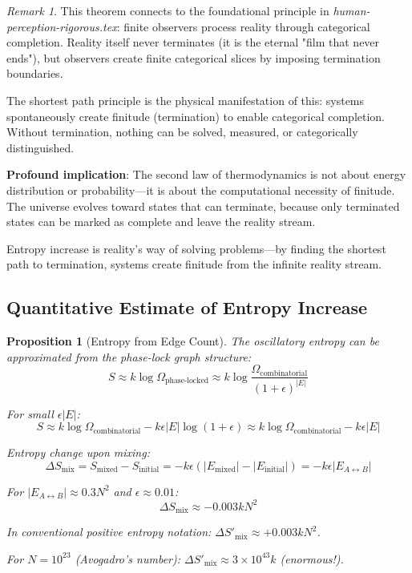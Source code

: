 \documentclass[12pt,a4paper]{article}
\newtheorem{proposition}[theorem]{Proposition}
\theoremstyle{remark}
\newtheorem{remark}[theorem]{Remark}
\begin{document}
\begin{remark}
This theorem connects to the foundational principle in \textit{human-perception-rigorous.tex}: finite observers process reality through categorical completion. Reality itself never terminates (it is the eternal "film that never ends"), but observers create finite categorical slices by imposing termination boundaries.

The shortest path principle is the physical manifestation of this: systems spontaneously create finitude (termination) to enable categorical completion. Without termination, nothing can be solved, measured, or categorically distinguished.

\textbf{Profound implication}: The second law of thermodynamics is not about energy distribution or probability—it is about the computational necessity of finitude. The universe evolves toward states that can terminate, because only terminated states can be marked as complete and leave the reality stream.

Entropy increase is reality's way of solving problems—by finding the shortest path to termination, systems create finitude from the infinite reality stream.
\end{remark}

\subsection{Quantitative Estimate of Entropy Increase}

\begin{proposition}[Entropy from Edge Count]
The oscillatory entropy can be approximated from the phase-lock graph structure:
\begin{equation}
S \approx k \log \Omega_{\text{phase-locked}} \approx k \log \frac{\Omega_{\text{combinatorial}}}{(1 + \epsilon)^{|E|}}
\end{equation}

For small $\epsilon |E|$:
\begin{equation}
S \approx k \log \Omega_{\text{combinatorial}} - k \epsilon |E| \log(1 + \epsilon) \approx k \log \Omega_{\text{combinatorial}} - k\epsilon |E|
\end{equation}

Entropy change upon mixing:
\begin{equation}
\Delta S_{\text{mix}} = S_{\text{mixed}} - S_{\text{initial}} = -k\epsilon(|E_{\text{mixed}}| - |E_{\text{initial}}|) = -k\epsilon |E_{A \leftrightarrow B}|
\end{equation}

For $|E_{A \leftrightarrow B}| \approx 0.3N^2$ and $\epsilon \approx 0.01$:
\begin{equation}
\Delta S_{\text{mix}} \approx -0.003 k N^2
\end{equation}

In conventional positive entropy notation: $\Delta S'_{\text{mix}} \approx +0.003 k N^2$.

For $N = 10^{23}$ (Avogadro's number): $\Delta S'_{\text{mix}} \approx 3 \times 10^{43} k$ (enormous!).
\end{proposition}
\end{document}
